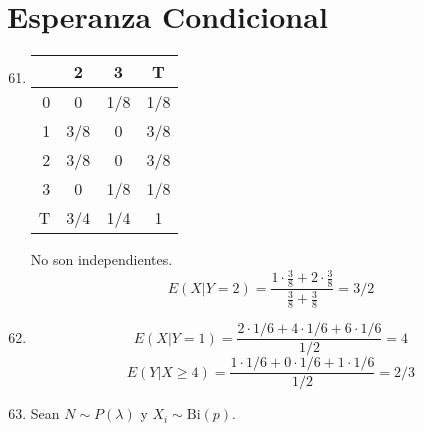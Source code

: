 \section{Esperanza Condicional}
\begin{enumerate}
	\setcounter{enumi}{60}
	\item
		\begin{tabular}{r|cc|c}
			\backslashbox{X}{Y}	& 2	& 3	& T	\\
			\hline
			
			0	& 0		& 1/8	& 1/8	\\
			1	& 3/8	& 0		& 3/8	\\
			2	& 3/8	& 0		& 3/8	\\
			3	& 0		& 1/8	& 1/8	\\ 
			\hline
			T	& 3/4	& 1/4	& 1		\\
		\end{tabular}
		
		No son independientes. $$E(X|Y=2) = \frac{1\cdot\frac{3}{8} + 2\cdot\frac{3}{8}}{\frac{3}{8} + \frac{3}{8}} = 3/2$$
	\item
		$$E(X|Y=1) = \frac{2\cdot 1/6 + 4\cdot 1/6 + 6\cdot 1/6}{1/2} = 4$$
		$$E(Y|X\geq 4) = \frac{1\cdot 1/6 + 0\cdot 1/6 + 1\cdot 1/6}{1/2} = 2/3$$
	\item
		Sean $N\sim P(\lambda)$ y $X_i\sim \text{Bi}(p)$.
		

\end{enumerate}
